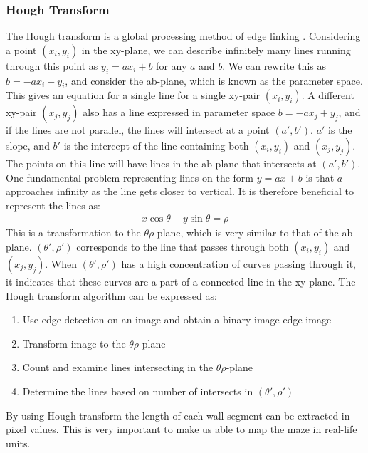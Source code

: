 \subsubsection{Hough Transform}\label{ch:hough}
The Hough transform is a global processing method of edge linking \cite{hough}.  Considering a point $(x_i,y_i)$ in the xy-plane, we can describe infinitely many lines running through this point as $y_i = ax_i + b$ for any $a$ and $b$. We can rewrite this as $b = -ax_i + y_i$, and consider the ab-plane, which is known as the parameter space. This gives an equation for a single line for a single xy-pair $(x_i,y_i)$. A different xy-pair $(x_j,y_j)$ also has a line expressed in parameter space $b = -ax_j + y_j$, and if the lines are not parallel, the lines will intersect at a point $(a',b')$. $a'$ is the slope, and $b'$ is the intercept of the line containing both $(x_i,y_i)$ and $(x_j,y_j)$. The points on this line will have lines in the ab-plane that intersects at $(a',b')$.\\

One fundamental problem representing lines on the form $y = ax + b$ is that $a$ approaches infinity as the line gets closer to vertical. It is therefore beneficial to represent the lines as:
\begin{align*}
x\cos{\theta} + y\sin{\theta} = \rho
\end{align*}
This is a transformation to the $\theta\rho$-plane, which is very similar to that of the ab-plane. $(\theta',\rho')$ corresponds to the line that passes through both $(x_i,y_i)$ and $(x_j,y_j)$. When $(\theta',\rho')$ has a high concentration of curves passing through it, it indicates that these curves are a part of a connected line in the xy-plane. The Hough transform algorithm can be expressed as\cite{g}:
\begin{enumerate}
\item Use edge detection on an image and obtain a binary image edge image
\item Transform image to the $\theta\rho$-plane
\item Count and examine lines intersecting in the $\theta\rho$-plane
\item Determine the lines based on number of intersects in $(\theta',\rho')$
\end{enumerate}
By using Hough transform the length of each wall segment can be extracted in pixel values. This is very important to make us able to map the maze in real-life units.

